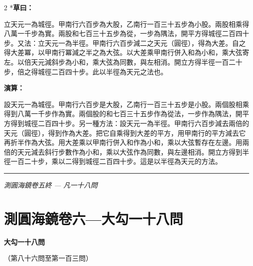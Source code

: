 \documentclass[11pt,a4paper]{article}
\newcommand{\longline}{\noindent\rule{\textwidth}{0.4pt}}
\newcommand{\tianyuan}[2]{\raisebox{-0.6ex}{\scriptsize$\begin{array}{c}#1\\\hline #2\end{array}$}}
\newcounter{probnum}
\begin{document}
\begin{paracol}{2}
\switchcolumn[0]*\textbf{草曰：}

\small 立天元一為城徑。甲南行六百步為大股，乙南行一百三十五步為小股。兩股相乘得八萬一千步為實。兩股和七百三十五步為從，一步為隅法，開平方得城徑二百四十步。又法：立天元一為半徑。甲南行六百步減二之天元（圓徑），得\tianyuan{600}{2}為大差。自之得大差冪，以甲南行冪減之半之為大弦。以大差乘甲南行併入和為小和，乘大弦寄左。以倍天元減斜步為小和，乘大弦為同數，與左相消。開立方得半徑一百二十步，倍之得城徑二百四十步。此以半徑為天元之法也。

\switchcolumn\textbf{演算：}

\small 設天元一為城徑。甲南行六百步是大股，乙南行一百三十五步是小股。兩個股相乘得到八萬一千步作為實。兩個股的和七百三十五步作為從法，一步作為隅法，開平方得到城徑二百四十步。另一種方法：設天元一為半徑。甲南行六百步減去兩倍的天元（圓徑），得到\tianyuan{600}{2}作為大差。把它自乘得到大差的平方，用甲南行的平方減去它再折半作為大弦。用大差乘以甲南行併入和作為小和，乘以大弦暫存在左邊。用兩倍的天元減去斜行步數作為小和，乘以大弦作為同數，與左邊相消。開立方得到半徑一百二十步，乘以二得到城徑二百四十步。這是以半徑為天元的方法。
\end{paracol}

\vspace{0.1cm}
\noindent{}
\par\vspace{0.3cm}

\vspace{0.5cm}
\longline
\begin{center}
\textit{測圓海鏡卷五終 --- 凡一十八問}
\end{center}
\newpage

\setcounter{probnum}{85}
\section{測圓海鏡卷六---大勾一十八問}
\label{sec:vol6}

\begin{center}
{\Large\bfseries\color{volcolor} 大勾一十八問}

\vspace{0.2cm}
{\small\color{notecolor} （第八十六問至第一百三問）}
\end{center}
\end{document}
